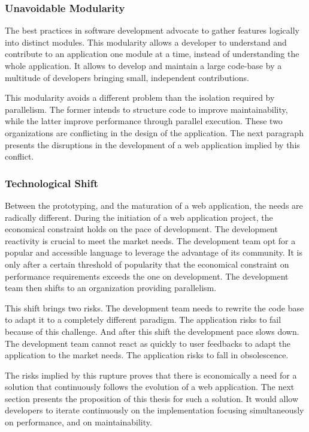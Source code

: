 \subsubsection{Unavoidable Modularity}

The best practices in software development advocate to gather features logically into distinct modules.
This modularity allows a developer to understand and contribute to an application one module at a time, instead of understanding the whole application.
It allows to develop and maintain a large code-base by a multitude of developers bringing small, independent contributions.

This modularity avoids a different problem than the isolation required by parallelism.
The former intends to structure code to improve maintainability, while the latter improve performance through parallel execution.
These two organizations are conflicting in the design of the application.
The next paragraph presents the disruptions in the development of a web application implied by this conflict.

\subsubsection{Technological Shift}

Between the prototyping, and the maturation of a web application, the needs are radically different.
During the initiation of a web application project, the economical constraint holds on the pace of development.
The development reactivity is crucial to meet the market needs.
The development team opt for a popular and accessible language to leverage the advantage of its community.
It is only after a certain threshold of popularity that the  economical constraint on performance requirements exceeds the one on development.
The development team then shifts to an organization providing parallelism.

This shift brings two risks.
The development team needs to rewrite the code base to adapt it to a completely different paradigm.
The application risks to fail because of this challenge.
And after this shift the development pace slows down.
The development team cannot react as quickly to user feedbacks to adapt the application to the market needs.
The application risks to fall in obsolescence.

The risks implied by this rupture proves that there is economically a need for a solution that continuously follows the evolution of a web application.
The next section presents the proposition of this thesis for such a solution.
It would allow developers to iterate continuously on the implementation focusing simultaneously on performance, and on maintainability.

